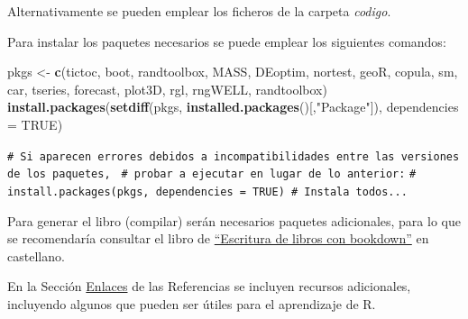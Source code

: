\documentclass[
  spanish,
  10pt,
]{book}
\newenvironment{Shaded}{\begin{snugshade}}{\end{snugshade}}
\newcommand{\AttributeTok}[1]{\textcolor[rgb]{0.13,0.29,0.53}{#1}}
\newcommand{\CommentTok}[1]{\textcolor[rgb]{0.56,0.35,0.01}{\textit{#1}}}
\newcommand{\ConstantTok}[1]{\textcolor[rgb]{0.56,0.35,0.01}{#1}}
\newcommand{\FunctionTok}[1]{\textcolor[rgb]{0.13,0.29,0.53}{\textbf{#1}}}
\newcommand{\NormalTok}[1]{#1}
\newcommand{\OtherTok}[1]{\textcolor[rgb]{0.56,0.35,0.01}{#1}}
\newcommand{\StringTok}[1]{\textcolor[rgb]{0.31,0.60,0.02}{#1}}
\theoremstyle{break}
\theoremstyle{nonumberplain}
\renewcommand{\CommentTok}[1]{\textcolor[rgb]{0.41,0.41,0.41}{\texttt{#1}}}
\begin{document}
Alternativamente se pueden emplear los ficheros de la carpeta \emph{codigo}.

Para instalar los paquetes necesarios se puede emplear los siguientes comandos:

\begin{Shaded}
\begin{Highlighting}[]
\NormalTok{pkgs }\OtherTok{\textless{}{-}} \FunctionTok{c}\NormalTok{(}\StringTok{\textquotesingle{}tictoc\textquotesingle{}}\NormalTok{, }\StringTok{\textquotesingle{}boot\textquotesingle{}}\NormalTok{, }\StringTok{\textquotesingle{}randtoolbox\textquotesingle{}}\NormalTok{, }\StringTok{\textquotesingle{}MASS\textquotesingle{}}\NormalTok{, }\StringTok{\textquotesingle{}DEoptim\textquotesingle{}}\NormalTok{, }\StringTok{\textquotesingle{}nortest\textquotesingle{}}\NormalTok{, }\StringTok{\textquotesingle{}geoR\textquotesingle{}}\NormalTok{, }\StringTok{\textquotesingle{}copula\textquotesingle{}}\NormalTok{,}
          \StringTok{\textquotesingle{}sm\textquotesingle{}}\NormalTok{, }\StringTok{\textquotesingle{}car\textquotesingle{}}\NormalTok{, }\StringTok{\textquotesingle{}tseries\textquotesingle{}}\NormalTok{, }\StringTok{\textquotesingle{}forecast\textquotesingle{}}\NormalTok{, }\StringTok{\textquotesingle{}plot3D\textquotesingle{}}\NormalTok{, }\StringTok{\textquotesingle{}rgl\textquotesingle{}}\NormalTok{, }\StringTok{\textquotesingle{}rngWELL\textquotesingle{}}\NormalTok{, }\StringTok{\textquotesingle{}randtoolbox\textquotesingle{}}\NormalTok{)}
\FunctionTok{install.packages}\NormalTok{(}\FunctionTok{setdiff}\NormalTok{(pkgs, }\FunctionTok{installed.packages}\NormalTok{()[,}\StringTok{"Package"}\NormalTok{]), }
                 \AttributeTok{dependencies =} \ConstantTok{TRUE}\NormalTok{)}

\CommentTok{\# Si aparecen errores debidos a incompatibilidades entre las versiones de los paquetes, }
\CommentTok{\# probar a ejecutar en lugar de lo anterior:}
\CommentTok{\# install.packages(pkgs, dependencies = TRUE) \# Instala todos...}
\end{Highlighting}
\end{Shaded}

Para generar el libro (compilar) serán necesarios paquetes adicionales,
para lo que se recomendaría consultar el libro de \href{https://rubenfcasal.github.io/bookdown_intro}{``Escritura de libros con bookdown''} en castellano.

En la Sección \hyperref[links]{Enlaces} de las Referencias se incluyen recursos adicionales, incluyendo algunos que pueden ser útiles para el aprendizaje de R.
\end{document}
